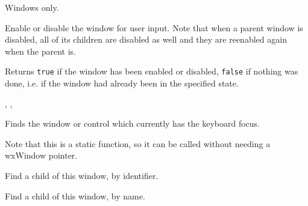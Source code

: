 


Windows only.


\label{wxwindowenable}


Enable or disable the window for user input. Note that when a parent window is
disabled, all of its children are disabled as well and they are reenabled again
when the parent is.




Returns {\tt true} if the window has been enabled or disabled, {\tt false} if
nothing was done, i.e. if the window had already been in the specified state.


,\rtfsp
{},\rtfsp
{}


\label{wxwindowfindfocus}


Finds the window or control which currently has the keyboard focus.


Note that this is a static function, so it can be called without needing a wxWindow pointer.





\label{wxwindowfindwindow}


Find a child of this window, by identifier.


Find a child of this window, by name.

